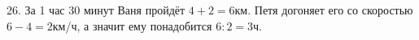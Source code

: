 26. За 1 час 30 минут Ваня пройдёт $4+2=6$км. Петя догоняет его со скоростью $6-4=2$км/ч, а значит ему понадобится $6:2=3$ч.\\
